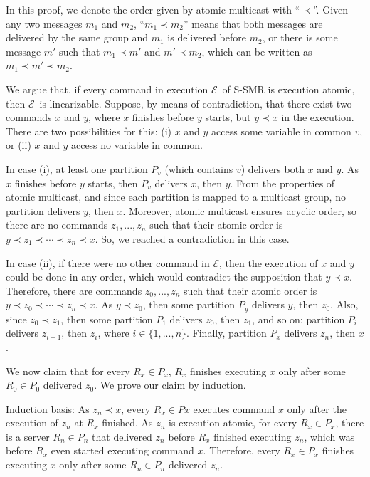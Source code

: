 \documentclass[10pt, conference, compsocconf, letterpaper]{IEEEtranv17}
\newcommand{\ex}{$\mathcal{E}$}
\begin{document}
In this proof, we denote the order given by atomic multicast with ``$\prec$''. Given any two messages $m_1$ and $m_2$, ``$m_1 \prec m_2$'' means that both messages are delivered by the same group and $m_1$ is delivered before $m_2$, or there is some message $m'$ such that $m_1 \prec m'$ and $m' \prec m_2$, which can be written as \mbox{$m_1 \prec m' \prec m_2$}.

We argue that, if every command in execution \ex\ of \mbox{S-SMR} is execution atomic, then \ex\ is linearizable. Suppose, by means of contradiction, that there exist two commands $x$ and $y$, where $x$ finishes before $y$ starts, but $y \prec x$ in the execution. There are two possibilities for this: (i) $x$ and $y$ access some variable in common $v$, or (ii) $x$ and $y$ access no variable in common.

In case (i), at least one partition $P_v$ (which contains $v$) delivers both $x$ and $y$. As $x$ finishes before $y$ starts, then $P_v$ delivers $x$, then $y$. From the properties of atomic multicast, and since each partition is mapped to a multicast group, no partition delivers $y$, then $x$. Moreover, atomic multicast ensures acyclic order, so there are no commands $z_1, ..., z_n$ such that their atomic order is $y \prec z_1 \prec \cdots \prec z_n \prec x$. So, we reached a contradiction in this case.

In case (ii), if there were no other command in \ex, then the execution of $x$ and $y$ could be done in any order, which would contradict the supposition that $y \prec x$. Therefore, there are commands $z_0, ..., z_n$ such that their atomic order is $y \prec z_0 \prec \cdots \prec z_n \prec x$. As $y \prec z_0$, then some partition $P_y$ delivers $y$, then $z_0$. Also, since $z_0 \prec z_1$, then some partition $P_1$ delivers $z_0$, then $z_1$, and so on: partition $P_i$ delivers $z_{i-1}$, then $z_i$, where $i \in \{1, ..., n\}$. Finally, partition $P_x$ delivers $z_n$, then $x$.

We now claim that for every $R_x \in P_x$, $R_x$ finishes executing $x$ only after some $R_0 \in P_0$ delivered $z_0$.
We prove our claim by induction.

Induction basis: As $z_n \prec x$, every $R_x \in Px$ executes command $x$ only after the execution of $z_n$ at $R_x$ finished. As $z_n$ is execution atomic, for every $R_x \in P_x$, there is a server $R_n \in P_n$ that delivered $z_n$ before $R_x$ finished executing $z_n$, which was before $R_x$ even started executing command $x$. Therefore, every $R_x \in P_x$ finishes executing $x$ only after some $R_n \in P_n$ delivered $z_n$.
\end{document}
